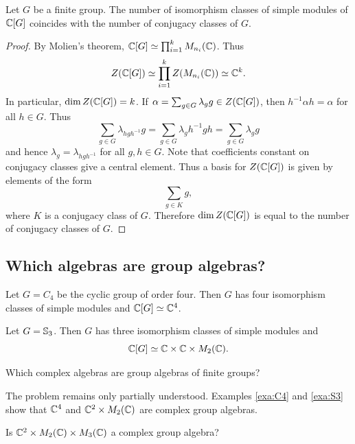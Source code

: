 \begin{theorem}
    Let $G$ be a finite group. The number of isomorphism classes of simple modules of $\mathbb{C}[G]$
    coincides with the number of conjugacy classes of $G$. 
\end{theorem}

\begin{proof}
    By Molien's theorem, $\mathbb{C}[G]\simeq\prod_{i=1}^kM_{n_i}(\mathbb{C})$. Thus 
    \[
		Z(\mathbb{C}[G])\simeq\prod_{i=1}^kZ(M_{n_i}(\mathbb{C}))\simeq\mathbb{C}^k.
	\]
	In particular, $\dim Z(\mathbb{C}[G])=k$. If $\alpha=\sum_{g\in
	G}\lambda_gg\in Z(\mathbb{C}[G])$, then $h^{-1}\alpha h=\alpha$ for all $h\in
	G$. Thus 
	\[
		\sum_{g\in G}\lambda_{hgh^{-1}}g=
		\sum_{g\in G}\lambda_g h^{-1}gh=\sum_{g\in G}\lambda_gg
	\]
	and hence $\lambda_{g}=\lambda_{hgh^{-1}}$ for all $g,h\in G$. 
  Note that 
  coefficients constant on conjugacy classes give a central element. Thus 
  a basis for 
	$Z(\mathbb{C}[G])$ is given by elements of the form 
	\[
		\sum_{g\in K}g,
	\]
  where $K$ is a conjugacy class of $G$. Therefore $\dim Z(\mathbb{C}[G])$ is equal to
  the number of conjugacy classes of $G$.
\end{proof}

\begin{optional}

\section{Which algebras are group algebras?}

\begin{example}
\label{exa:C4}
    Let $G=C_4$ be the cyclic group of order four. Then
    $G$ has four isomorphism classes of simple modules and 
    $\mathbb{C}[G]\simeq\mathbb{C}^4$. 
\end{example}

\begin{example}
\label{exa:S3}
    Let $G=\mathbb{S}_3$. Then $G$ has three isomorphism classes of simple modules and
    \[
    \mathbb{C}[G]\simeq\mathbb{C}\times\mathbb{C}\times M_2(\mathbb{C}).
    \]
\end{example}

\begin{open}[Brauer]
    Which complex algebras are group algebras of finite groups? 
\end{open}

The problem remains only partially understood. 
Examples \ref{exa:C4} and \ref{exa:S3} show
that $\mathbb{C}^4$ and $\mathbb{C}^2\times M_2(\mathbb{C})$ are complex group algebras. 

\begin{xca}
    Is $\mathbb{C}^2\times M_2(\mathbb{C})\times M_3(\mathbb{C})$ a complex group algebra?  
\end{xca}

\end{optional} 

